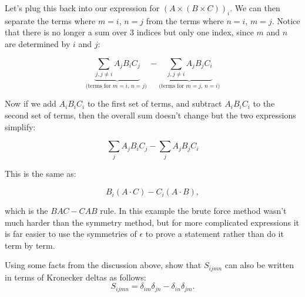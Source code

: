 Let's plug this back into our expression for $ \left( A \times (B \times C) \right)_i$. We can then separate the terms where $m=i$, $n=j$ from the terms where $n=i$, $m=j$. Notice that there is no longer a sum over 3 indices but 
only one index, since $m$ and $n$ are determined by $i$ and $j$:

\[ \underbrace{\sum_{j, j \neq i}  A_j B_i C_j}_{\text{(terms for $m=i$, $n=j$) }}    -  \underbrace{ \sum_{j, j \neq i}   A_j B_j C_i}_{\text{(terms for $m=j$, $n=i$)}} \] 
	                         	  


Now if we add $A_i B_i C_i$ to the first set of terms, and subtract $A_i B_i C_i$ to the second set of terms, then the overall sum doesn't change but the two 
expressions simplify:

\[ \sum_{j}  A_j B_i C_j    -  \sum_{j}   A_j B_j C_i  \]

This is the same as:

\[ B_i  (A \cdot C) - C_i (A \cdot B), \]

which is the $BAC-CAB$ rule.  In this example the brute force method wasn't much harder than the symmetry method, but for more complicated expressions it is far easier to use the symmetries of $\epsilon$ to prove a statement rather than do it term by term.

\begin{exercise}
Using some facts from the discussion above, show that  $S_{ijmn}$ can also be written in terms of Kronecker deltas as follows:
\[S_{ijmn} = \delta_{im} \delta_{jn} - \delta_{in} \delta_{jm}. \]
\end{exercise}


